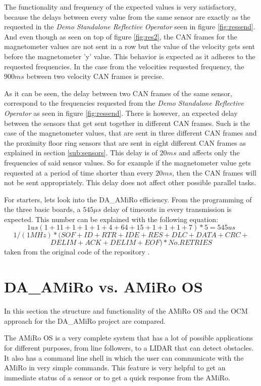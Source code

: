 \documentclass[12pt]{report}%
\begin{document}
The functionality and frequency of the expected values is very satisfactory, because the delays between every value from the same sensor are exactly as the requested in the \textit{Demo Standalone Reflective Operator} seen in figure \ref{fig:ressend}. And even though as seen on top of figure \ref{fig:res2}, the CAN frames for the magnetometer values are not sent in a row but the value of the velocity gets sent before the magnetometer 'y' value. This behavior is expected as it adheres to the requested frequencies. In the case from the velocities requested frequency, the $900ms$ between two velocity CAN frames is precise.

As it can be seen, the delay between two CAN frames of the same sensor, correspond to the frequencies requested from the \textit{Demo Standalone Reflective Operator} as seen in figure \ref{fig:ressend}. There is however, an expected delay between the sensors that get sent together in different CAN frames. Such is the case of the magnetometer values, that are sent in three different CAN frames and the proximity floor ring sensors that are sent in eight different CAN frames as explained in section \ref{sub:sensors}. This delay is of $20ms$ and affects only the frequencies of said  sensor values. So for example if the magnetometer value gets requested at a period of time shorter than every $20ms$, then the CAN frames will not be sent appropriately. This delay does not affect other possible parallel tasks.

For starters, lets look into the DA\_AMiRo efficiency. From the programming of the three basic boards, a $545\mu s$ delay of timeouts in every transmission is expected. This number can be explained with the following equation: $$1 us   (1+11+1+1+1+4+64+15+1+1+1+7)*5= 545 us$$ $$1/(1MHz)*(SOF+ID+RTR+IDE+RES+DLC+DATA+CRC+$$ $$DELIM+ACK+DELIM+EOF)*No. RETRIES$$
taken from the original code of the repository \cite{AMiRo_Wiki}.

\section{DA\_AMiRo vs. AMiRo OS}
In this section the structure and functionality of the AMiRo OS and the OCM approach for the DA\_AMiRo project are compared.

The AMiRo OS is a very complete system that has a lot of possible applications for different purposes, from line followers, to a LIDAR that can detect obstacles. It also has a command line shell in which the user can communicate with the AMiRo in very simple commands. This feature is very helpful to get an immediate status of a sensor or to get a quick response from the AMiRo.
\end{document}
